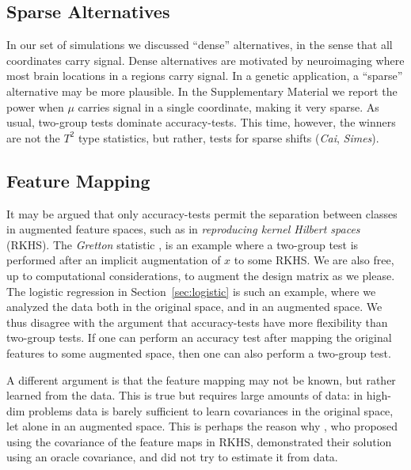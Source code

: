 \documentclass[]{bio}
\begin{document}
\subsection{Sparse Alternatives}
\label{sec:sparse}
In our set of simulations we discussed ``dense'' alternatives, in the sense that all coordinates carry signal.
Dense alternatives are motivated by neuroimaging where most brain locations in a regions carry signal.
In a genetic application, a ``sparse'' alternative may be more plausible. 
In the Supplementary Material we report the power when $\mu$ carries signal in a single coordinate, making it very sparse. 
As usual, two-group tests dominate accuracy-tests.
This time, however, the winners are not the $T^2$ type statistics, but rather, tests for sparse shifts (\emph{Cai}, \emph{Simes}).





\subsection{Feature Mapping}
It may be argued that only accuracy-tests permit the separation between classes in augmented feature spaces, such as in \emph{reproducing kernel Hilbert spaces} (RKHS).
The \emph{Gretton} statistic \citep{gretton_kernel_2012-1}, is an example where a two-group test is performed after an implicit augmentation of $x$ to some RKHS.
We are also free, up to computational considerations, to augment the design matrix as we please. 
The logistic regression in Section~\ref{sec:logistic} is such an example, where we analyzed the data both in the original space, and in an augmented space. 
We thus disagree with the argument that accuracy-tests have more flexibility than two-group tests. 
If one can perform an accuracy test after mapping the original features to some augmented space, then one can also perform a two-group test. 


A different argument is that the feature mapping may not be known, but rather learned from the data. 
This is true but requires large amounts of data: in high-dim problems data is barely sufficient to learn covariances in the original space, let alone in an augmented space.  
This is perhaps the reason why \cite{harchaoui2009kernel}, who proposed using the covariance of the feature maps in RKHS, demonstrated their solution using an oracle covariance, and did not try to estimate it from data. 
\end{document}
